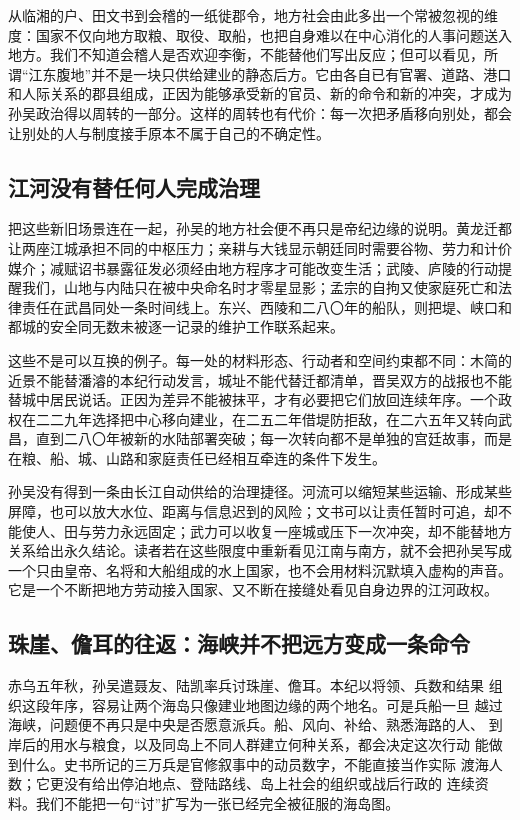 从临湘的户、田文书到会稽的一纸徙郡令，地方社会由此多出一个常被忽视的维度：国家不仅向地方取粮、取役、取船，也把自身难以在中心消化的人事问题送入地方。我们不知道会稽人是否欢迎李衡，不能替他们写出反应；但可以看见，所谓“江东腹地”并不是一块只供给建业的静态后方。它由各自已有官署、道路、港口和人际关系的郡县组成，正因为能够承受新的官员、新的命令和新的冲突，才成为孙吴政治得以周转的一部分。这样的周转也有代价：每一次把矛盾移向别处，都会让别处的人与制度接手原本不属于自己的不确定性。
\subsection{江河没有替任何人完成治理}
把这些新旧场景连在一起，孙吴的地方社会便不再只是帝纪边缘的说明。黄龙迁都让两座江城承担不同的中枢压力；亲耕与大钱显示朝廷同时需要谷物、劳力和计价媒介；减赋诏书暴露征发必须经由地方程序才可能改变生活；武陵、庐陵的行动提醒我们，山地与内陆只在被中央命名时才零星显影；孟宗的自拘又使家庭死亡和法律责任在武昌同处一条时间线上。东兴、西陵和二八〇年的船队，则把堤、峡口和都城的安全同无数未被逐一记录的维护工作联系起来。

这些不是可以互换的例子。每一处的材料形态、行动者和空间约束都不同：木简的近景不能替潘濬的本纪行动发言，城址不能代替迁都清单，晋吴双方的战报也不能替城中居民说话。正因为差异不能被抹平，才有必要把它们放回连续年序。一个政权在二二九年选择把中心移向建业，在二五二年借堤防拒敌，在二六五年又转向武昌，直到二八〇年被新的水陆部署突破；每一次转向都不是单独的宫廷故事，而是在粮、船、城、山路和家庭责任已经相互牵连的条件下发生。

孙吴没有得到一条由长江自动供给的治理捷径。河流可以缩短某些运输、形成某些屏障，也可以放大水位、距离与信息迟到的风险；文书可以让责任暂时可追，却不能使人、田与劳力永远固定；武力可以收复一座城或压下一次冲突，却不能替地方关系给出永久结论。读者若在这些限度中重新看见江南与南方，就不会把孙吴写成一个只由皇帝、名将和大船组成的水上国家，也不会用材料沉默填入虚构的声音。它是一个不断把地方劳动接入国家、又不断在接缝处看见自身边界的江河政权。
\label{reader:wu-river-society:end}

\subsection{珠崖、儋耳的往返：海峡并不把远方变成一条命令}

赤乌五年秋，孙吴遣聂友、陆凯率兵讨珠崖、儋耳。本纪以将领、兵数和结果
组织这段年序，容易让两个海岛只像建业地图边缘的两个地名。可是兵船一旦
越过海峡，问题便不再只是中央是否愿意派兵。船、风向、补给、熟悉海路的人、
到岸后的用水与粮食，以及同岛上不同人群建立何种关系，都会决定这次行动
能做到什么。史书所记的三万兵是官修叙事中的动员数字，不能直接当作实际
渡海人数；它更没有给出停泊地点、登陆路线、岛上社会的组织或战后行政的
连续资料。我们不能把一句“讨”扩写为一张已经完全被征服的海岛图。

